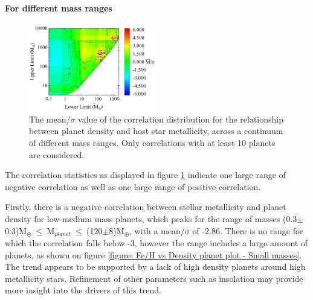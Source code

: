 \documentclass[a4paper,twocolumn,12pt]{article}
\begin{document}




\paragraph{For different mass ranges}
\vspace{-1.0em}

\begin{figure}[h!]
    \centering
    \includegraphics[width=0.49\textwidth]{Graphs/FeH vs Density correlations - Mass ranges.png}
    \caption{The mean/$\sigma$ value of the correlation distribution for the relationship between planet density and host star metallicity, across a continuum of different mass ranges. Only correlations with at least 10 planets are considered.}
    \label{figure: Fe/H vs Density correlations - Mass ranges (All)}
\end{figure}


The correlation statistics as displayed in figure \ref{figure: Fe/H vs Density correlations - Mass ranges (All)} indicate one large range of negative correlation as well as one large range of positive correlation.

Firstly, there is a negative correlation between stellar metallicity and planet density for low-medium mass planets, which peaks for the range of masses (0.3$\pm$0.3)M$_{\oplus}~\leq~$M$_{planet}~\leq~$(120$\pm$8)M$_{\oplus}$, with a mean/$\sigma$ of -2.86. There is no range for which the correlation falls below -3, however the range includes a large amount of planets, as shown on figure \ref{figure: Fe/H vs Density planet plot - Small masses}. %
The trend appears to be supported by a lack of high density planets around high metallicity stars. Refinement of other parameters such as insolation may provide more insight into the drivers of this trend.
\end{document}
